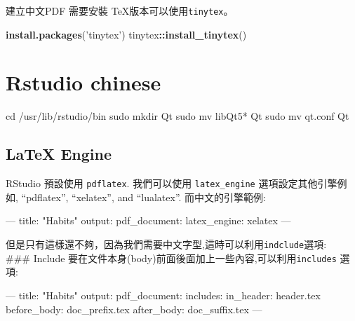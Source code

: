 \documentclass[]{book}
\newenvironment{Shaded}{\begin{snugshade}}{\end{snugshade}}
\newcommand{\AttributeTok}[1]{\textcolor[rgb]{0.77,0.63,0.00}{#1}}
\newcommand{\BuiltInTok}[1]{#1}
\newcommand{\FunctionTok}[1]{\textcolor[rgb]{0.00,0.00,0.00}{#1}}
\newcommand{\KeywordTok}[1]{\textcolor[rgb]{0.13,0.29,0.53}{\textbf{#1}}}
\newcommand{\NormalTok}[1]{#1}
\newcommand{\OperatorTok}[1]{\textcolor[rgb]{0.81,0.36,0.00}{\textbf{#1}}}
\newcommand{\OtherTok}[1]{\textcolor[rgb]{0.56,0.35,0.01}{#1}}
\newcommand{\StringTok}[1]{\textcolor[rgb]{0.31,0.60,0.02}{#1}}
\theoremstyle{definition}
\theoremstyle{definition}
\theoremstyle{definition}
\theoremstyle{remark}
\begin{document}
建立中文PDF 需要安裝 TeX版本可以使用\texttt{tinytex}。

\begin{Shaded}
\begin{Highlighting}[]
\KeywordTok{install.packages}\NormalTok{(}\StringTok{'tinytex'}\NormalTok{)}
\NormalTok{tinytex}\OperatorTok{::}\KeywordTok{install_tinytex}\NormalTok{()}
\end{Highlighting}
\end{Shaded}

\hypertarget{rstudio-chinese}{%
\section{Rstudio chinese}\label{rstudio-chinese}}

\begin{Shaded}
\begin{Highlighting}[]
\BuiltInTok{cd}\NormalTok{ /usr/lib/rstudio/bin}
\FunctionTok{sudo}\NormalTok{ mkdir Qt}
\FunctionTok{sudo}\NormalTok{ mv libQt5* Qt}
\FunctionTok{sudo}\NormalTok{ mv qt.conf Qt}
\end{Highlighting}
\end{Shaded}

\hypertarget{latex-engine}{%
\subsection{LaTeX Engine}\label{latex-engine}}

RStudio 預設使用 \texttt{pdflatex}. 我們可以使用 \texttt{latex\_engine}
選項設定其他引擎例如, ``pdflatex'', ``xelatex'', and ``lualatex''.
而中文的引擎範例:

\begin{Shaded}
\begin{Highlighting}[]
\OtherTok{---}
\FunctionTok{title:}\AttributeTok{ }\StringTok{"Habits"}
\FunctionTok{output:}
  \FunctionTok{pdf_document:}
  \FunctionTok{latex_engine:}\AttributeTok{ xelatex}
\OtherTok{---}
\end{Highlighting}
\end{Shaded}

但是只有這樣還不夠，因為我們需要中文字型,這時可以利用\texttt{indclude}選項:\\
\#\#\# Include
要在文件本身(body)前面後面加上一些內容,可以利用\texttt{includes} 選項:

\begin{Shaded}
\begin{Highlighting}[]
\OtherTok{---}
\FunctionTok{title:}\AttributeTok{ }\StringTok{"Habits"}
\FunctionTok{output:}
  \FunctionTok{pdf_document:}
    \FunctionTok{includes:}
      \FunctionTok{in_header:}\AttributeTok{ header.tex}
      \FunctionTok{before_body:}\AttributeTok{ doc_prefix.tex}
      \FunctionTok{after_body:}\AttributeTok{ doc_suffix.tex}
\OtherTok{---}
\end{Highlighting}
\end{Shaded}
\end{document}
